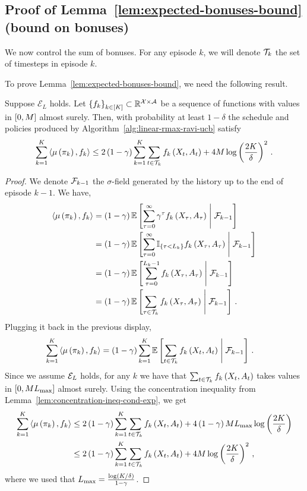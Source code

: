 \subsection{Proof of Lemma~\ref{lem:expected-bonuses-bound} (bound on bonuses)}
\label{app:expected-bonuses-bound}

We now control the sum of bonuses. For any episode $k$, we will denote $\mathcal{T}_k$ the set of timesteps in episode $k$.

\expectedbonusesbound*

\noindent To prove Lemma~\ref{lem:expected-bonuses-bound}, we need the following result.
%
\begin{lemma} \label{lem:expectation-to-highprob}
    Suppose $\mathcal{E}_L$ holds. Let $\left\{ f_k \right\}_{k \in \left[ K \right]} \subset \mathbb{R}^{\mathcal{X} \times \mathcal{A}}$ be a sequence of functions with values in $\left[ 0, M \right]$ almost surely. Then, with probability at least $1 - \delta$ the schedule and policies produced by Algorithm~\ref{alg:linear-rmax-ravi-ucb} satisfy
    \begin{equation*}
        \sum_{k=1}^K \left\langle \mu \left( \pi_k \right), f_k \right\rangle \leq 2 \left( 1 - \gamma \right) \sum_{k=1}^K \sum_{t \in \mathcal{T}_k} f_k \left( X_t, A_t \right) + 4 M \log \left( \frac{2 K}{\delta} \right)^2\,.
    \end{equation*}
\end{lemma}
%
\begin{proof}
    We denote $\mathcal{F}_{k-1}$ the $\sigma$-field generated by the history up to the end of episode $k-1$. We have,
    \begin{align*}
        \left\langle \mu \left( \pi_k \right), f_k \right\rangle &= \left( 1 - \gamma \right) \mathbb{E} \left[ \sum_{\tau = 0}^\infty \gamma^\tau f_k \left( X_\tau, A_\tau \right) \mathrel{}\middle|\mathrel{} \mathcal{F}_{k-1} \right] \\
        &= \left( 1 - \gamma \right) \mathbb{E} \left[ \sum_{\tau = 0}^\infty \mathbb{I}_{\left\{\tau < L_k\right\}} f_k \left( X_\tau, A_\tau \right) \mathrel{}\middle|\mathrel{} \mathcal{F}_{k-1} \right] \\
        &= \left( 1 - \gamma \right) \mathbb{E} \left[ \sum_{\tau = 0}^{L_k - 1} f_k \left( X_\tau, A_\tau \right) \mathrel{}\middle|\mathrel{} \mathcal{F}_{k-1} \right] \\
        &= \left( 1 - \gamma \right) \mathbb{E} \left[ \sum_{\tau \in \mathcal{T}_k} f_k \left( X_\tau, A_\tau \right) \mathrel{}\middle|\mathrel{} \mathcal{F}_{k-1} \right]\,.
    \end{align*}
    Plugging it back in the previous display,
    \begin{align*}
        \sum_{k=1}^K \left\langle \mu \left( \pi_k \right), f_k \right\rangle &= \left( 1 - \gamma \right) \sum_{k=1}^K \mathbb{E} \left[ \sum_{t \in \mathcal{T}_k} f_k \left( X_t, A_t \right) \mathrel{}\middle|\mathrel{} \mathcal{F}_{k-1} \right]\,.
    \end{align*}
    Since we assume $\mathcal{E}_L$ holds, for any $k$ we have that $\sum_{t \in \mathcal{T}_k} f_k \left( X_t, A_t \right)$ takes values in $\left[ 0, M L_{\max} \right]$ almost surely. Using the concentration inequality from Lemma~\ref{lem:concentration-ineq-cond-exp}, we get
    \begin{align*}
        \sum_{k=1}^K \left\langle \mu \left( \pi_k \right), f_k \right\rangle &\leq 2 \left( 1 - \gamma \right) \sum_{k=1}^K \sum_{t \in \mathcal{T}_k} f_k \left( X_t, A_t \right) + 4 \left( 1 - \gamma \right) M L_{\max} \log \left( \frac{2 K}{\delta} \right) \\
        &\leq 2 \left( 1 - \gamma \right) \sum_{k=1}^K \sum_{t \in \mathcal{T}_k} f_k \left( X_t, A_t \right) + 4 M \log \left( \frac{2 K}{\delta} \right)^2\,,
    \end{align*}
    where we used that $L_{\max} = \frac{\log \left( K / \delta \right)}{1 - \gamma}$.
\end{proof}
